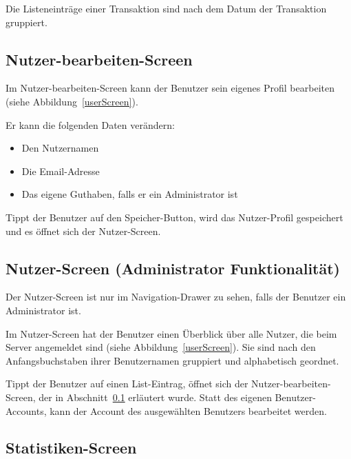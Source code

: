 Die Listeneinträge einer Transaktion sind nach dem Datum der Transaktion gruppiert.


\subsection{Nutzer-bearbeiten-Screen} \label{subsec:edit-user-screen}

Im Nutzer-bearbeiten-Screen kann der Benutzer sein eigenes Profil bearbeiten (siehe Abbildung~\ref{userScreen}).


Er kann die folgenden Daten verändern:

\begin{itemize}
	\item Den Nutzernamen
	\item Die Email-Adresse
	\item Das eigene Guthaben, falls er ein Administrator ist
\end{itemize}

Tippt der Benutzer auf den Speicher-Button, wird das Nutzer-Profil gespeichert und es öffnet sich der Nutzer-Screen.

\subsection{Nutzer-Screen (Administrator Funktionalität)} \label{subsec:user-screen}

Der Nutzer-Screen ist nur im Navigation-Drawer zu sehen, falls der Benutzer ein Administrator ist.

Im Nutzer-Screen hat der Benutzer einen Überblick über alle Nutzer, die beim Server angemeldet sind (siehe Abbildung~\ref{userScreen}).
Sie sind nach den Anfangsbuchstaben ihrer Benutzernamen gruppiert und alphabetisch geordnet.

Tippt der Benutzer auf einen List-Eintrag, öffnet sich der Nutzer-bearbeiten-Screen, der in Abschnitt~\ref{subsec:edit-user-screen} erläutert wurde.
Statt des eigenen Benutzer-Accounts, kann der Account des ausgewählten Benutzers bearbeitet werden.

\subsection{Statistiken-Screen} \label{subsec:statistics-screen}


